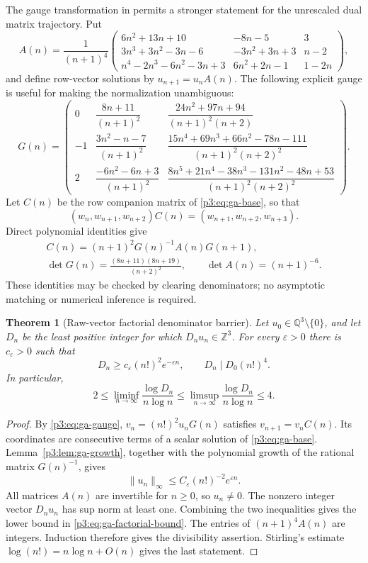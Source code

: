 \documentclass[11pt,a4paper]{article}
\newtheorem{theorem}{Theorem}[section]
\theoremstyle{definition}
\theoremstyle{remark}
\numberwithin{equation}{section}
\begin{document}
The gauge transformation in \cite[\S8.4]{p3:KMLWSK26} permits a stronger
statement for the unrescaled dual matrix trajectory. Put
\[
 A(n)=\frac1{(n+1)^4}
 \begin{pmatrix}
 6n^2+13n+10&-8n-5&3\\
 3n^3+3n^2-3n-6&-3n^2+3n+3&n-2\\
 n^4-2n^3-6n^2-3n+3&6n^2+2n-1&1-2n
 \end{pmatrix},
\]
and define row-vector solutions by $u_{n+1}=u_n A(n)$.
The following explicit gauge is useful for making the normalization
unambiguous:
\[
 G(n)=\begin{pmatrix}
 0&\dfrac{8n+11}{(n+1)^2}
  &\dfrac{24n^2+97n+94}{(n+1)^2(n+2)}\\[5pt]
 -1&\dfrac{3n^2-n-7}{(n+1)^2}
  &\dfrac{15n^4+69n^3+66n^2-78n-111}{(n+1)^2(n+2)^2}\\[5pt]
 2&\dfrac{-6n^2-6n+3}{(n+1)^2}
  &\dfrac{8n^5+21n^4-38n^3-131n^2-48n+53}{(n+1)^2(n+2)^2}
 \end{pmatrix}.
\]
Let $C(n)$ be the row companion matrix of \eqref{p3:eq:ga-base}, so that
\[
 (w_n,w_{n+1},w_{n+2})C(n)=(w_{n+1},w_{n+2},w_{n+3}).
\]
Direct polynomial identities give
\begin{equation}\label{p3:eq:ga-gauge}
 \begin{gathered}
 C(n)=(n+1)^2G(n)^{-1}A(n)G(n+1),\\
 \det G(n)=\frac{(8n+11)(8n+19)}{(n+2)^2},\qquad
 \det A(n)=(n+1)^{-6}.
 \end{gathered}
\end{equation}
These identities may be checked by clearing denominators; no
asymptotic matching or numerical inference is required.

\begin{theorem}[Raw-vector factorial denominator barrier]
\label{p3:thm:ga-factorial}
Let $u_0\in\mathbb Q^3\setminus\{0\}$, and let $D_n$ be the least
positive integer for which $D_nu_n\in\mathbb Z^3$. For every
$\varepsilon>0$ there is $c_\varepsilon>0$ such that
\begin{equation}\label{p3:eq:ga-factorial-bound}
 D_n\ge c_\varepsilon(n!)^2e^{-\varepsilon n},
 \qquad D_n\mid D_0(n!)^4.
\end{equation}
In particular,
\[
 2\le\liminf_{n\to\infty}\frac{\log D_n}{n\log n}
 \le\limsup_{n\to\infty}\frac{\log D_n}{n\log n}\le4.
\]
\end{theorem}
\begin{proof}
By \eqref{p3:eq:ga-gauge},
$v_n=(n!)^2u_nG(n)$ satisfies $v_{n+1}=v_nC(n)$.
Its coordinates are consecutive terms of a scalar solution of
\eqref{p3:eq:ga-base}. Lemma~\ref{p3:lem:ga-growth}, together with the
polynomial growth of the rational matrix $G(n)^{-1}$, gives
\[
 \|u_n\|_\infty\le C_\varepsilon(n!)^{-2}e^{\varepsilon n}.
\]
All matrices $A(n)$ are invertible for $n\ge0$, so $u_n\ne0$.
The nonzero integer vector $D_nu_n$ has sup norm at least one.
Combining the two inequalities gives the lower bound in
\eqref{p3:eq:ga-factorial-bound}. The entries of $(n+1)^4A(n)$
are integers. Induction therefore gives the divisibility assertion.
Stirling's estimate $\log(n!)=n\log n+O(n)$ gives the last statement.
\end{proof}
\end{document}
